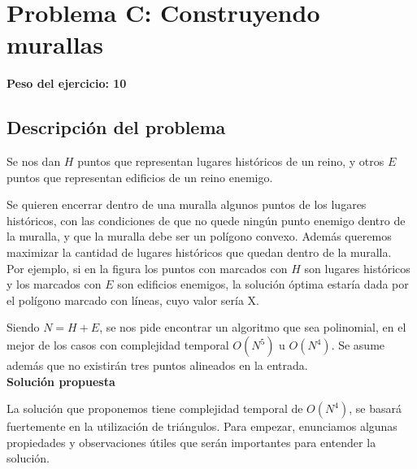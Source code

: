 \newpage{}
\section{Problema C: Construyendo murallas}
\textbf{Peso del ejercicio: 10}

\subsection{Descripción del problema}
Se nos dan $H$ puntos que representan lugares históricos de un reino, 
y otros $E$ puntos que representan edificios de un reino enemigo. 

Se quieren encerrar dentro de una muralla algunos puntos de los lugares históricos, 
con las condiciones de que no quede ningún punto enemigo dentro de la muralla, 
y que la muralla debe ser un polígono convexo. Además queremos maximizar la cantidad 
de lugares históricos que quedan dentro de la muralla. \\

Por ejemplo, si en la figura los puntos con marcados con $H$ son lugares históricos 
y los marcados con $E$ son edificios enemigos, la solución óptima estaría dada por 
el polígono marcado con líneas, cuyo valor sería X. 

Siendo $N = H + E$, se nos pide encontrar un algoritmo que sea polinomial, en el mejor 
de los casos con complejidad temporal $O(N^5)$ u $O(N^4)$. Se asume además que no existirán 
tres puntos alineados en la entrada. \\

\textbf{Solución propuesta}

La solución que proponemos tiene complejidad temporal de $O(N^4)$, se basará fuertemente 
en la utilización de triángulos. Para empezar, enunciamos algunas propiedades y observaciones 
útiles que serán importantes para entender la solución. 

